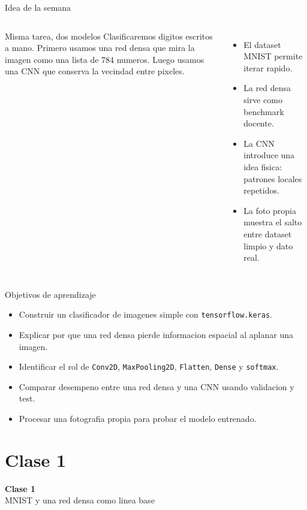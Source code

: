 \begin{frame}{Idea de la semana}
\begin{columns}[T,onlytextwidth]
\begin{block}{Misma tarea, dos modelos}
Clasificaremos digitos escritos a mano. Primero usamos una red densa que mira la imagen como una lista de 784 numeros. Luego usamos una CNN que conserva la vecindad entre pixeles.
\end{block}
\begin{itemize}
    \item El dataset MNIST permite iterar rapido.
    \item La red densa sirve como benchmark docente.
    \item La CNN introduce una idea fisica: patrones locales repetidos.
    \item La foto propia muestra el salto entre dataset limpio y dato real.
\end{itemize}
\centering
\resizebox{0.96\linewidth}{!}{}
\end{columns}
\end{frame}

\begin{frame}{Objetivos de aprendizaje}
\begin{itemize}
    \item Construir un clasificador de imagenes simple con \texttt{tensorflow.keras}.
    \item Explicar por que una red densa pierde informacion espacial al aplanar una imagen.
    \item Identificar el rol de \texttt{Conv2D}, \texttt{MaxPooling2D}, \texttt{Flatten}, \texttt{Dense} y \texttt{softmax}.
    \item Comparar desempeno entre una red densa y una CNN usando validacion y test.
    \item Procesar una fotografia propia para probar el modelo entrenado.
\end{itemize}
\end{frame}

\section{Clase 1}

\begin{frame}[plain]
\centering
\vfill
{\Huge \bfseries Clase 1}\\[0.4cm]
{\Large MNIST y una red densa como linea base}
\vfill
\end{frame}

